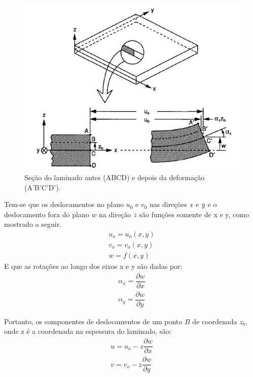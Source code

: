 \begin{figure}[h]
	\caption{\label{fig_laminatedeformation}Seção do laminado antes (ABCD) e depois da deformação (A'B'C'D').}
  \centering
  \includegraphics[scale=1.0]{figura/LaminateDeformation}
\end{figure}

Tem-se que os deslocamentos no plano $u_0$ e $v_0$ nas direções $\emph x$ e $\emph y$ e o deslocamento fora do plano $w$ na direção $\emph z$ são funções somente de x e y, como mostrado a seguir.
\begin{equation} \label{displacements}
\begin{split}
u_{o}=u_{o}(x,y)\\
v_{o}=v_{o}(x,y)\\
w=f(x,y)
\end{split}
\end{equation}
E que as rotações ao longo dos eixos x e y são dadas por:
\begin{equation} \label{rotations}
\begin{split}
\alpha_{x}=\dfrac{\partial w} {\partial x}\\
\alpha_{y}=\dfrac{\partial w} {\partial y}
\end{split}
\end{equation}

Portanto, os componentes de deslocamentos de um ponto $B$ de coordenada $z_b$, onde z é a coordenada na espessura do laminado, são:
\begin{equation} \label{displacements_B}
\begin{split}
u=u_{o} - z\dfrac{\partial w}{\partial x}\\
v=v_{o} - z\dfrac{\partial w}{\partial y}
\end{split}
\end{equation}

